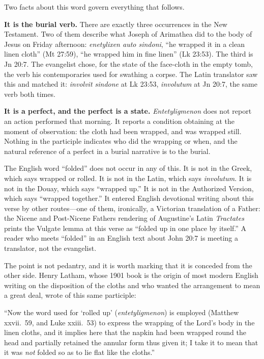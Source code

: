 Two facts about this word govern everything that follows.

\textbf{It is the burial verb.} There are exactly three occurrences in the New
Testament. Two of them describe what Joseph of Arimathea did to the body of
Jesus on Friday afternoon: \emph{enetylixen auto sindoni}, ``he wrapped it in
a clean linen cloth'' (Mt 27:59), ``he wrapped him in fine linen'' (Lk 23:53).
The third is Jn 20:7. The evangelist chose, for the state of the face-cloth in
the empty tomb, the verb his contemporaries used for swathing a corpse. The
Latin translator saw this and matched it: \emph{involvit sindone} at Lk 23:53,
\emph{involutum} at Jn 20:7, the same verb both times.

\textbf{It is a perfect, and the perfect is a state.} \emph{Entetyligmenon}
does not report an action performed that morning. It reports a condition
obtaining at the moment of observation: the cloth had been wrapped, and was
wrapped still. Nothing in the participle indicates who did the wrapping or
when, and the natural reference of a perfect in a burial narrative is to the
burial.

The English word ``folded'' does not occur in any of this. It is not in the
Greek, which says wrapped or rolled. It is not in the Latin, which says
\emph{involutum}. It is not in the Douay, which says ``wrapped up.'' It is not
in the Authorized Version, which says ``wrapped together.'' It entered English
devotional writing about this verse by other routes---one of them, ironically,
a Victorian translation of a Father: the Nicene and Post-Nicene Fathers
rendering of Augustine's Latin \emph{Tractates} prints the Vulgate lemma at
this verse as ``folded up in one place by itself.'' A reader who meets
``folded'' in an English text about John 20:7 is meeting a translator, not the
evangelist.

The point is not pedantry, and it is worth marking that it is conceded from
the other side. Henry Latham, whose 1901 book is the origin of most modern
English writing on the disposition of the cloths and who wanted the
arrangement to mean a great deal, wrote of this same participle:

\begin{studyframe}\small
``Now the word used for `rolled up' (\emph{entetyligmenon}) is employed
(Matthew xxvii.\ 59, and Luke xxiii.\ 53) to express the wrapping of the
Lord's body in the linen cloths, and it implies here that the napkin had been
wrapped round the head and partially retained the annular form thus given it;
I take it to mean that it was \emph{not} folded so as to lie flat like the
cloths.''
\end{studyframe}

